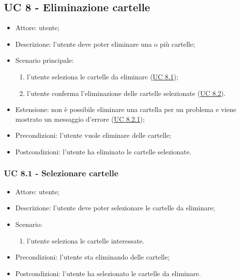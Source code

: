    \subsection{UC 8 - Eliminazione cartelle}
    \begin{itemize}
        \item Attore: utente;
        \item Descrizione: l'utente deve poter eliminare una o più cartelle;
        \item Scenario principale:
            \begin{enumerate}
            \item l'utente seleziona le cartelle da eliminare (\hyperref[sec: UC 8.1]{UC 8.1});
            \item l'utente conferma l'eliminazione delle cartelle selezionate (\hyperref[sec: UC 8.2]{UC 8.2}).
            \end{enumerate}
        \item Estensione: non è possibile eliminare una cartella per un problema e viene mostrato un messaggio d'errore (\hyperref[sec: UC 8.2.1]{UC 8.2.1});
        \item Precondizioni: l'utente vuole eliminare delle cartelle;
        \item Postcondizioni: l'utente ha eliminato le cartelle selezionate.
    \end{itemize}
    \subsubsection{UC 8.1 - Selezionare cartelle} \label{sec: UC 8.1}
    \begin{itemize}
        \item Attore: utente;
        \item Descrizione: l'utente deve poter selezionare le cartelle da eliminare;
        \item Scenario:
        \begin{enumerate}
        \item l'utente seleziona le cartelle interessate.
        \end{enumerate}
        \item Precondizioni: l'utente sta eliminando delle cartelle;
        \item Postcondizioni: l'utente ha selezionato le cartelle da eliminare.
    \end{itemize}

